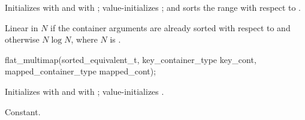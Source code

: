 \begin{addedblock}
\begin{itemdescr}
\pnum
\effects Initializes  with  and
 with ; value-initializes
; and sorts the range  with respect to
.

\pnum
\complexity
Linear in $N$ if the container arguments are already sorted with respect
to  and otherwise $N \log N$, where $N$
is .
\end{itemdescr}

%
\begin{itemdecl}
flat_multimap(sorted_equivalent_t, key_container_type key_cont,
              mapped_container_type mapped_cont);
\end{itemdecl}

\begin{itemdescr}
\pnum
\effects Initializes  with
 and  with
; value-initializes .

\pnum
\complexity
Constant.
\end{itemdescr}


\end{addedblock}
